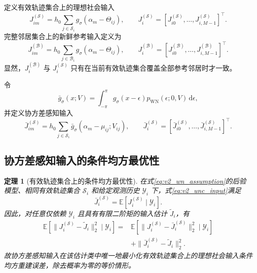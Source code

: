 \documentclass[UTF8,fontset=windows,11pt]{ctexart}
\newtheorem{theorem}{定理}[section]
\newcommand{\E}{\mathbb E}
\begin{document}
定义有效轨迹集合上的理想社会输入
\begin{equation}
 J_{im}^{(\mathcal S)}=h_0\sum_{j\in\mathcal S_i}g_\sigma(\alpha_m-\Theta_{ij}),
 \qquad
 J_i^{(\mathcal S)}=[J_{i0}^{(\mathcal S)},\ldots,J_{i,M-1}^{(\mathcal S)}]^{\top}.
 \label{eq:v2_tracked_ideal}
\end{equation}
完整邻居集合上的新鲜参考输入定义为
\begin{equation}
 J_{im}^{(\mathcal B)}=h_0\sum_{j\in\mathcal B_i}g_\sigma(\alpha_m-\Theta_{ij}),
 \qquad
 J_i^{(\mathcal B)}=[J_{i0}^{(\mathcal B)},\ldots,J_{i,M-1}^{(\mathcal B)}]^{\top}.
 \label{eq:v2_full_ideal}
\end{equation}
显然，$J_i^{(\mathcal B)}$ 与 $J_i^{(\mathcal S)}$ 只有在当前有效轨迹集合覆盖全部参考邻居时才一致。

令
\begin{equation}
 \bar g_\sigma(x;V)=\int_{-\pi}^{\pi}g_\sigma(x-\epsilon)
 p_{\operatorname{WN}}(\epsilon;0,V)\,\mathrm d\epsilon,
 \label{eq:v2_conv_kernel}
\end{equation}
并定义协方差感知输入
\begin{equation}
 \bar J_{im}^{(\mathcal S)}=h_0\sum_{j\in\mathcal S_i}
 \bar g_\sigma(\alpha_m-\mu_{ij};V_{ij}),
 \qquad
 \bar J_i^{(\mathcal S)}=[\bar J_{i0}^{(\mathcal S)},\ldots,\bar J_{i,M-1}^{(\mathcal S)}]^{\top}.
 \label{eq:v2_unc_input}
\end{equation}

\subsection{协方差感知输入的条件均方最优性}

\begin{theorem}[有效轨迹集合上的条件均方最优性]
\label{thm:v2_mmse}
在式\eqref{eq:v2_wn_assumption}的后验模型、相同有效轨迹集合 $\mathcal S_i$ 和给定观测历史 $\mathcal Y_i$ 下，式\eqref{eq:v2_unc_input}满足
\begin{equation}
 \bar J_i^{(\mathcal S)}=\E[J_i^{(\mathcal S)}\mid\mathcal Y_i].
 \label{eq:v2_conditional_mean}
\end{equation}
因此，对任意仅依赖 $\mathcal Y_i$ 且具有有限二阶矩的输入估计 $\widetilde J_i$，有
\begin{equation}
 \begin{aligned}
 \E[\|J_i^{(\mathcal S)}-\widetilde J_i\|_2^2\mid\mathcal Y_i]
 ={}&\E[\|J_i^{(\mathcal S)}-\bar J_i^{(\mathcal S)}\|_2^2\mid\mathcal Y_i]\\
 &+\|\bar J_i^{(\mathcal S)}-\widetilde J_i\|_2^2.
 \end{aligned}
 \label{eq:v2_orthogonal_projection}
\end{equation}
故协方差感知输入在该估计类中唯一地最小化有效轨迹集合上的理想社会输入条件均方重建误差，除去概率为零的等价情形。
\end{theorem}
\end{document}
